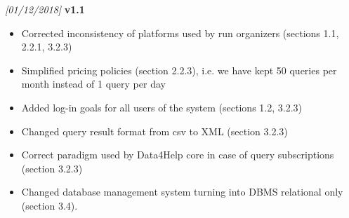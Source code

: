 \textit{[01/12/2018]} \textbf{v1.1}
\begin{itemize}
    \item Corrected inconsistency of platforms used by run organizers (sections 1.1, 2.2.1, 3.2.3)
    \item Simplified pricing policies (section 2.2.3), i.e. we have kept 50 queries per month instead of 1 query per day
    \item Added log-in goals for all users of the system (sections 1.2, 3.2.3) 
    \item Changed query result format from csv to XML (section 3.2.3)
    \item Correct paradigm used by Data4Help core in case of query subscriptions (section 3.2.3)
    \item Changed database management system turning into DBMS relational only (section 3.4).
\end{itemize}